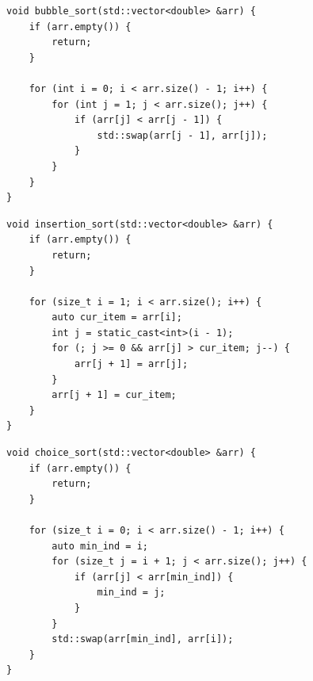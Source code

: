 \documentclass[a4paper,12pt]{article}
\begin{document}
\begin{lstlisting}[frame=single,caption=Сортировка пузырьком, breaklines]
void bubble_sort(std::vector<double> &arr) {
    if (arr.empty()) {
        return;
    }

    for (int i = 0; i < arr.size() - 1; i++) {
        for (int j = 1; j < arr.size(); j++) {
            if (arr[j] < arr[j - 1]) {
                std::swap(arr[j - 1], arr[j]);
            }
        }
    }
}
        		\end{lstlisting}        		
    
\begin{lstlisting}[frame=single,caption=Сортировка вставками, breaklines]
void insertion_sort(std::vector<double> &arr) {
    if (arr.empty()) {
        return;
    }

    for (size_t i = 1; i < arr.size(); i++) {
        auto cur_item = arr[i];
        int j = static_cast<int>(i - 1);
        for (; j >= 0 && arr[j] > cur_item; j--) {
            arr[j + 1] = arr[j];
        }
        arr[j + 1] = cur_item;
    }
}
\end{lstlisting}

\begin{lstlisting}[frame=single,caption=Сортировка выбором, breaklines]
void choice_sort(std::vector<double> &arr) {
    if (arr.empty()) {
        return;
    }

    for (size_t i = 0; i < arr.size() - 1; i++) {
        auto min_ind = i;
        for (size_t j = i + 1; j < arr.size(); j++) {
            if (arr[j] < arr[min_ind]) {
                min_ind = j;
            }
        }
        std::swap(arr[min_ind], arr[i]);
    }
}
\end{lstlisting}
    \newpage
\end{document}
